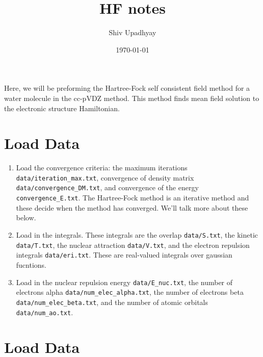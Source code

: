 \documentclass[12pt]{article}
\title{HF notes}
\date{\today}
\author{Shiv Upadhyay}
\begin{document}
\maketitle

Here, we will be preforming the Hartree-Fock self consistent field method for a water molecule in the cc-pVDZ method. 
This method finds mean field solution to the electronic structure Hamiltonian. 

\section{Load Data}
\begin{enumerate}
\item Load the convergence criteria: the maximum iterations \texttt{data/iteration\_max.txt}, convergence of density matrix \texttt{data/convergence\_DM.txt}, and convergence of the energy \texttt{convergence\_E.txt}. The Hartree-Fock method is an iterative method and these decide when the method has converged. We'll talk more about these below.
\item Load in the integrals. These integrals are the overlap \texttt{data/S.txt}, the kinetic \texttt{data/T.txt}, the nuclear attraction \texttt{data/V.txt}, and the electron repulsion integrals \texttt{data/eri.txt}. These are real-valued integrals over gaussian fucntions.
\item Load in the nuclear repulsion energy \texttt{data/E\_nuc.txt}, the number of electrons alpha \texttt{data/num\_elec\_alpha.txt}, the number of electrons beta \texttt{data/num\_elec\_beta.txt}, and the number of atomic orbitals \texttt{data/num\_ao.txt}.
\end{enumerate}

\section{Load Data}

\newpage


\end{document}
